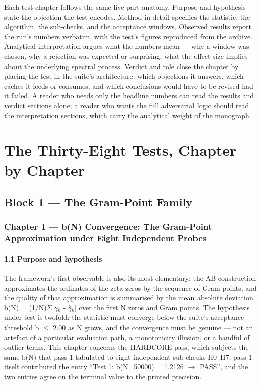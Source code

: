\documentclass[10pt]{article}
\begin{document}
Each test chapter follows the same five-part anatomy. Purpose and hypothesis state the objection the test encodes. Method in detail specifies the statistic, the algorithm, the sub-checks, and the acceptance windows. Observed results report the run's numbers verbatim, with the test's figures reproduced from the archive. Analytical interpretation argues what the numbers mean --- why a window was chosen, why a rejection was expected or surprising, what the effect size implies about the underlying spectral process. Verdict and role close the chapter by placing the test in the suite's architecture: which objections it answers, which caches it feeds or consumes, and which conclusions would have to be revised had it failed. A reader who needs only the headline numbers can read the results and verdict sections alone; a reader who wants the full adversarial logic should read the interpretation sections, which carry the analytical weight of the monograph.

\section{The Thirty-Eight Tests, Chapter by Chapter}

\subsection{Block 1 --- The Gram-Point Family}

\subsubsection{Chapter 1 --- b(N) Convergence: The Gram-Point Approximation under Eight Independent Probes}

\paragraph{1.1 Purpose and hypothesis}

The framework's first observable is also its most elementary: the AB construction approximates the ordinates of the zeta zeros by the sequence of Gram points, and the quality of that approximation is summarised by the mean absolute deviation b(N) = (1/N)$\Sigma$|$\gamma$$_k$ - $\gamma$̃$_k$| over the first N zeros and Gram points. The hypothesis under test is twofold: the statistic must converge below the suite's acceptance threshold b $\le$ 2.00 as N grows, and the convergence must be genuine --- not an artefact of a particular evaluation path, a monotonicity illusion, or a handful of outlier terms. This chapter concerns the HARDCORE pass, which subjects the same b(N) that pass 1 tabulated to eight independent sub-checks H0--H7; pass 1 itself contributed the entry ``Test 1: b(N=50000) = 1.2126 $\rightarrow$ PASS'', and the two entries agree on the terminal value to the printed precision.
\end{document}
